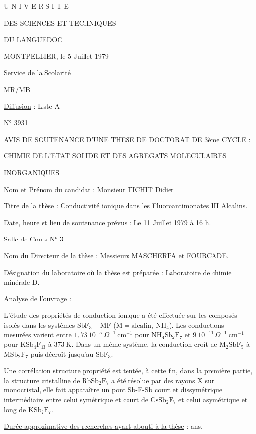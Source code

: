 U N I V E R S I T E

DES SCIENCES ET TECHNIQUES

\uline{DU LANGUEDOC}

MONTPELLIER, le 5 Juillet 1979

Service de la Scolarité

MR/MB

\uline{Diffusion} : Liste A

N° 3931

\uline{AVIS DE SOUTENANCE D'UNE THESE DE DOCTORAT DE 3ème CYCLE} :

\uline{CHIMIE DE L'ETAT SOLIDE ET DES AGREGATS MOLECULAIRES}

\uline{INORGANIQUES}

\uline{Nom et Prénom du candidat} : Monsieur TICHIT Didier

\uline{Titre de la thèse} : Conductivité ionique dans les Fluoroantimonates III Alcalins.

\uline{Date, heure et lieu de soutenance prévus} : Le 11 Juillet 1979 à 16 h.

Salle de Cours N° 3.

\uline{Nom du Directeur de la thèse} : Messieurs MASCHERPA et FOURCADE.

\uline{Désignation du laboratoire où la thèse est préparée} : Laboratoire de chimie minérale D.

\uline{Analyse de l'ouvrage} :

L'étude des propriétés de conduction ionique a été effectuée sur les composés isolés dans les systèmes $\mathrm{SbF}_3$ -- $\mathrm{MF}$ ($\mathrm{M}=\text{alcalin},\ \mathrm{NH}_4$). Les conductions mesurées varient entre $1{,}73\ 10^{-5}\ \Omega^{-1}\ \mathrm{cm}^{-1}$ pour $\mathrm{NH}_4\mathrm{Sb}_2\mathrm{F}_7$ et $9\ 10^{-11}\ \Omega^{-1}\ \mathrm{cm}^{-1}$ pour $\mathrm{KSb}_4\mathrm{F}_{13}$ à $373\ \mathrm{K}$. Dans un même système, la conduction croît de $\mathrm{M}_2\mathrm{SbF}_5$ à $\mathrm{MSb}_2\mathrm{F}_7$ puis décroît jusqu'au $\mathrm{SbF}_3$.

Une corrélation structure propriété est tentée, à cette fin, dans la première partie, la structure cristalline de $\mathrm{RbSb}_2\mathrm{F}_7$ a été résolue par  des rayons X sur monocristal, elle fait apparaître un pont Sb-F-Sb court et dissymétrique intermédiaire entre celui symétrique et court de $\mathrm{CsSb}_2\mathrm{F}_7$ et celui asymétrique et long de $\mathrm{KSb}_2\mathrm{F}_7$.

\uline{Durée approximative des recherches ayant abouti à la thèse} :  ans.

